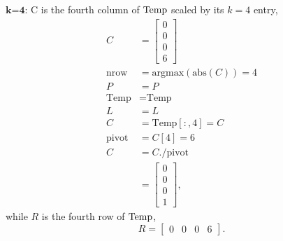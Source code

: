 $\textbf{k=4:}$ C is the fourth column of ${\rm Temp}$ scaled by its $k=4$ entry,
\begin{align*}
    C &=\left[\begin{array}{r} 0 \\ 0 \\ 0 \\ 6 \end{array} \right]\\
    \textrm{nrow} &= \textrm{argmax}\left(\textrm{abs}\left(C\right) \right) = 4 \\
    P &= P \\
    \textrm{Temp} &= \textrm{Temp} \\
    L &= L \\
    C &= \textrm{Temp}[:, 4] = C \\
    \textrm{pivot}&=C[4] = 6\\
    C &=C. \slash \textrm{pivot} \\
    &= \left[\begin{array}{r} 0 \\ 0 \\0 \\1 \end{array} \right],
\end{align*}
while $R$ is the fourth row of $\rm Temp$,
$$ R = \left[ \begin{array}{rrrr} 0 & 0 & 0 & 6 \end{array} \right]. $$

